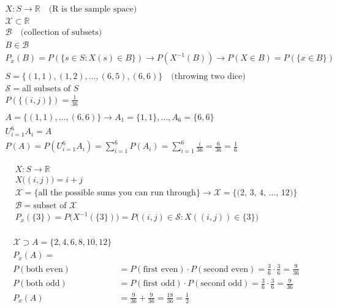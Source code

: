 \documentclass[10pt]{article}
\begin{document}
\begin{align*}
    X : S \to \mathbb{R} \quad\text{(R is the sample space)}\\
    \mathcal{X} \subset \mathbb{R}\\
    \mathcal{B}\quad\text{(collection of subsets)}\\
    B \in \mathcal{B}\\
    P_x(B) = P(\{s \in S: X(s)\in B\}) \to P(X^{-1}(B)) \to P(X \in B) = P(\{x \in B\})\\
    \\
    S = \{(1, 1), (1, 2), …, (6, 5), (6, 6)\}\quad\text{(throwing two dice)}\\
    \mathcal{S} = \text{all subsets of $S$}\\
    P(\{(i, j)\}) = \frac{1}{36}\\
    \\
    A = \{(1, 1), …, (6, 6)\} \to A_1 = \{1, 1\}, …, A_6 = \{6, 6\}\\
    U_{i = 1}^6 A_i = A\\
    P(A) = P(U_{i = 1}^6 A_i) = \sum_{i = 1}^{6} P(A_i)= \sum_{i = 1}^{6} \frac{i}{36} = \frac{6}{36} = \frac{1}{6}
\end{align*}

\begin{align*}
    X : S \to \mathbb{R}\\
    X\Big((i, j)\Big) = i + j\\
    \mathcal{X} = \{\text{all the possible sums you can run through}\} \to \mathcal{X} = \{\text{(2, 3, 4, …, 12)}\}\\
    \mathcal{B} = \text{subset of } \mathcal{X}\\
    P_x(\{3\}) = P\Big(X^{-1}(\{3\})\Big) = P\Big((i, j) \in \mathcal{S}: X((i, j)) \in \{3\}\Big)\\
\end{align*}

\begin{align*}
    \mathcal{X} \supset A = \{2, 4, 6, 8, 10, 12\}\\
    P_x(A) = \\
    P(\text{both even}) &= P(\text{first even}) \cdot P(\text{second even}) = \frac{3}{6} \cdot \frac{3}{6} = \frac{9}{36}\\
    P(\text{both odd}) &= P(\text{first odd}) \cdot P(\text{second odd}) = \frac{3}{6} \cdot \frac{3}{6} = \frac{9}{36}\\
    P_x(A) &= \frac{9}{36} + \frac{9}{36} = \frac{18}{36} = \frac{1}{2}
\end{align*}
\end{document}
